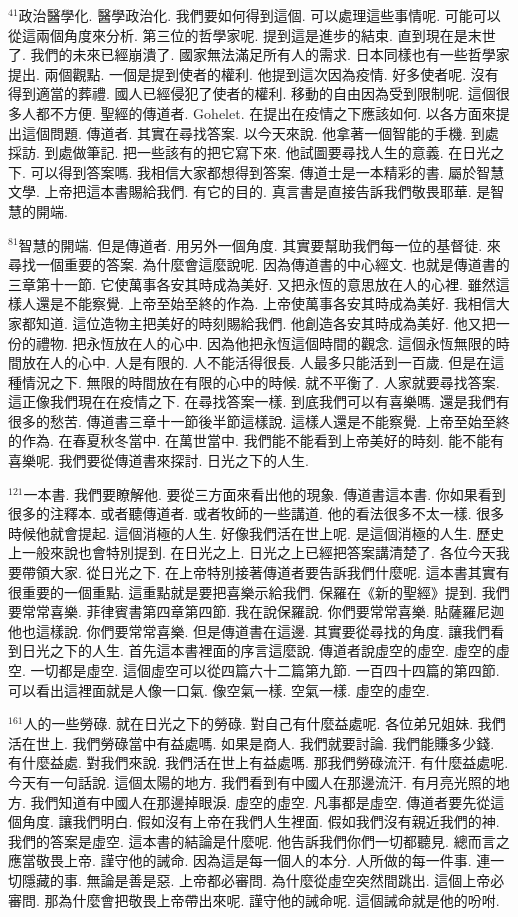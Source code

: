\documentclass{book}
\begin{document}
$^{41}$政治醫學化.
醫學政治化.
我們要如何得到這個.
可以處理這些事情呢.
可能可以從這兩個角度來分析.
第三位的哲學家呢.
提到這是進步的結束.
直到現在是末世了.
我們的未來已經崩潰了.
國家無法滿足所有人的需求.
日本同樣也有一些哲學家提出.
兩個觀點.
一個是提到使者的權利.
他提到這次因為疫情.
好多使者呢.
沒有得到適當的葬禮.
國人已經侵犯了使者的權利.
移動的自由因為受到限制呢.
這個很多人都不方便.
聖經的傳道者.
Gohelet.
在提出在疫情之下應該如何.
以各方面來提出這個問題.
傳道者.
其實在尋找答案.
以今天來說.
他拿著一個智能的手機.
到處採訪.
到處做筆記.
把一些該有的把它寫下來.
他試圖要尋找人生的意義.
在日光之下.
可以得到答案嗎.
我相信大家都想得到答案.
傳道士是一本精彩的書.
屬於智慧文學.
上帝把這本書賜給我們.
有它的目的.
真言書是直接告訴我們敬畏耶華.
是智慧的開端.

$^{81}$智慧的開端.
但是傳道者.
用另外一個角度.
其實要幫助我們每一位的基督徒.
來尋找一個重要的答案.
為什麼會這麼說呢.
因為傳道書的中心經文.
也就是傳道書的三章第十一節.
它使萬事各安其時成為美好.
又把永恆的意思放在人的心裡.
雖然這樣人還是不能察覺.
上帝至始至終的作為.
上帝使萬事各安其時成為美好.
我相信大家都知道.
這位造物主把美好的時刻賜給我們.
他創造各安其時成為美好.
他又把一份的禮物.
把永恆放在人的心中.
因為他把永恆這個時間的觀念.
這個永恆無限的時間放在人的心中.
人是有限的.
人不能活得很長.
人最多只能活到一百歲.
但是在這種情況之下.
無限的時間放在有限的心中的時候.
就不平衡了.
人家就要尋找答案.
這正像我們現在在疫情之下.
在尋找答案一樣.
到底我們可以有喜樂嗎.
還是我們有很多的愁苦.
傳道書三章十一節後半節這樣說.
這樣人還是不能察覺.
上帝至始至終的作為.
在春夏秋冬當中.
在萬世當中.
我們能不能看到上帝美好的時刻.
能不能有喜樂呢.
我們要從傳道書來探討.
日光之下的人生.

$^{121}$一本書.
我們要瞭解他.
要從三方面來看出他的現象.
傳道書這本書.
你如果看到很多的注釋本.
或者聽傳道者.
或者牧師的一些講道.
他的看法很多不太一樣.
很多時候他就會提起.
這個消極的人生.
好像我們活在世上呢.
是這個消極的人生.
歷史上一般來說也會特別提到.
在日光之上.
日光之上已經把答案講清楚了.
各位今天我要帶領大家.
從日光之下.
在上帝特別接著傳道者要告訴我們什麼呢.
這本書其實有很重要的一個重點.
這重點就是要把喜樂示給我們.
保羅在《新的聖經》提到.
我們要常常喜樂.
菲律賓書第四章第四節.
我在說保羅說.
你們要常常喜樂.
貼薩羅尼迦他也這樣說.
你們要常常喜樂.
但是傳道書在這邊.
其實要從尋找的角度.
讓我們看到日光之下的人生.
首先這本書裡面的序言這麼說.
傳道者說虛空的虛空.
虛空的虛空.
一切都是虛空.
這個虛空可以從四篇六十二篇第九節.
一百四十四篇的第四節.
可以看出這裡面就是人像一口氣.
像空氣一樣.
空氣一樣.
虛空的虛空.

$^{161}$人的一些勞碌.
就在日光之下的勞碌.
對自己有什麼益處呢.
各位弟兄姐妹.
我們活在世上.
我們勞碌當中有益處嗎.
如果是商人.
我們就要討論.
我們能賺多少錢.
有什麼益處.
對我們來說.
我們活在世上有益處嗎.
那我們勞碌流汗.
有什麼益處呢.
今天有一句話說.
這個太陽的地方.
我們看到有中國人在那邊流汗.
有月亮光照的地方.
我們知道有中國人在那邊掉眼淚.
虛空的虛空.
凡事都是虛空.
傳道者要先從這個角度.
讓我們明白.
假如沒有上帝在我們人生裡面.
假如我們沒有親近我們的神.
我們的答案是虛空.
這本書的結論是什麼呢.
他告訴我們你們一切都聽見.
總而言之應當敬畏上帝.
謹守他的誡命.
因為這是每一個人的本分.
人所做的每一件事.
連一切隱藏的事.
無論是善是惡.
上帝都必審問.
為什麼從虛空突然間跳出.
這個上帝必審問.
那為什麼會把敬畏上帝帶出來呢.
謹守他的誡命呢.
這個誡命就是他的吩咐.
\end{document}
